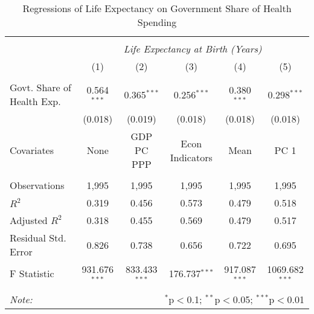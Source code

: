 \begin{table}[!htbp] \centering
  \caption{Regressions of Life Expectancy on Government Share of Health Spending \label{main_regs}}
\begin{tabular}{@{\extracolsep{5pt}}lccccc}
\\[-1.8ex]\hline
\hline \\[-1.8ex]
& \multicolumn{5}{c}{\textit{Life Expectancy at Birth (Years)}} \
\cr \
\\[-1.8ex] & (1) & (2) & (3) & (4) & (5) \\
\hline \\[-1.8ex]
 Govt. Share of Health Exp. & 0.564$^{***}$ & 0.365$^{***}$ & 0.256$^{***}$ & 0.380$^{***}$ & 0.298$^{***}$ \\
  & (0.018) & (0.019) & (0.018) & (0.018) & (0.018) \\
 Covariates & None & GDP PC PPP & Econ Indicators & Mean & PC 1 \\
\hline \\[-1.8ex]
 Observations & 1,995 & 1,995 & 1,995 & 1,995 & 1,995 \\
 $R^2$ & 0.319 & 0.456 & 0.573 & 0.479 & 0.518 \\
 Adjusted $R^2$ & 0.318 & 0.455 & 0.569 & 0.479 & 0.517 \\
 Residual Std. Error & 0.826 & 0.738 & 0.656 & 0.722 & 0.695  \\
 F Statistic & 931.676$^{***}$  & 833.433$^{***}$  & 176.737$^{***}$  & 917.087$^{***}$  & 1069.682$^{***}$  \\
\hline
\hline \\[-1.8ex]
\textit{Note:} & \multicolumn{5}{r}{$^{*}$p$<$0.1; $^{**}$p$<$0.05; $^{***}$p$<$0.01} \\
\end{tabular}
\end{table}